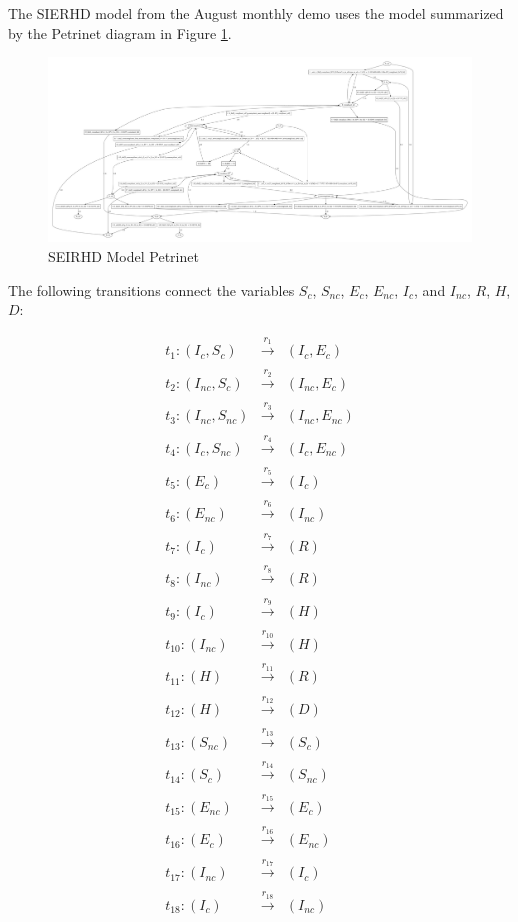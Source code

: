 The SIERHD model from the August monthly demo uses the model summarized by the Petrinet diagram in Figure \ref{fig:seirhd}.

\begin{figure}
    \includegraphics[width=\linewidth]{fig/seirhd-aug}
    \caption{\label{fig:seirhd} SEIRHD Model Petrinet}
\end{figure}

The following transitions connect the variables $S_c$, $S_{nc}$, $E_c$, $E_{nc}$, $I_c$, and $I_{nc}$, $R$, $H$, $D$:

\begin{eqnarray*}
    t_1: (I_c, S_c) &\xrightarrow[]{r_1}& (I_c, E_c) \\
    t_2: (I_{nc}, S_c) &\xrightarrow[]{r_2}& (I_{nc}, E_c)\\
    t_3: (I_{nc}, S_{nc}) &\xrightarrow[]{r_3}& (I_{nc}, E_{nc})\\
    t_4: (I_c, S_{nc}) &\xrightarrow[]{r_4}& (I_c, E_{nc})\\
    t_5: (E_c) &\xrightarrow[]{r_5}& (I_c)\\
    t_6:(E_{nc}) &\xrightarrow[]{r_6}& (I_{nc})\\
    t_7:(I_c) &\xrightarrow[]{r_7}& (R)\\
    t_8: (I_{nc}) &\xrightarrow[]{r_8}& (R)\\
    t_9:(I_c) &\xrightarrow[]{r_9}& (H)\\
    t_{10}:(I_{nc}) &\xrightarrow[]{r_{10}}& (H)\\
    t_{11}:(H) &\xrightarrow[]{r_{11}}& (R)\\
    t_{12}:(H) &\xrightarrow[]{r_{12}}& (D)\\
    t_{13}:(S_{nc}) &\xrightarrow[]{r_{13}}& (S_c)\\
    t_{14}:(S_c) &\xrightarrow[]{r_{14}}& (S_{nc})\\
    t_{15}:(E_{nc}) &\xrightarrow[]{r_{15}}& (E_c)\\
    t_{16}:(E_c) &\xrightarrow[]{r_{16}}& (E_{nc})\\
    t_{17}:(I_{nc}) &\xrightarrow[]{r_{17}}& (I_c)\\
    t_{18}:(I_c) &\xrightarrow[]{r_{18}}& (I_{nc})
\end{eqnarray*}

